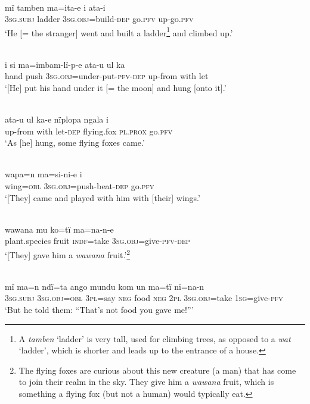 \\
\gll mï      tamben  ma=ita-e        i    ata-i\\
3\textsc{sg.subj}  ladder  3\textsc{sg.obj}=build-\textsc{dep}  go.\textsc{pfv}  up-go.\textsc{pfv}\\
\glt ‘He [= the stranger] went and built a ladder\footnote{A \textit{tamben} ‘ladder’ is very tall, used for climbing trees, as opposed to a \textit{wat} ‘ladder’, which is shorter and leads up to the entrance of a house.} and climbed up.’

\\
\gll i    si    ma=imbam-lï-p-e        ata-u    ul    ka\\
hand  push  3\textsc{sg.obj}=under-put-\textsc{pfv-dep}  up-from  with  let\\
\glt ‘[He] put his hand under it [= the moon] and hung [onto it].’

\\
\gll ata-u    ul    ka-e  nïplopa  ngala    i\\
up-from  with  let-\textsc{dep}  flying.fox  \textsc{pl.prox}  go.\textsc{pfv}\\
\glt ‘As [he] hung, some flying foxes came.’

\\
\gll wapa=n  ma=si-ni-e          i\\
wing=\textsc{obl}  3\textsc{sg.obj}=push-beat-\textsc{dep}  go.\textsc{pfv}\\
\glt ‘[They] came and played with him with [their] wings.’

\\
\gll wawana  mu    ko=tï  ma=na-n-e\\
plant.species  fruit  \textsc{indf}=take  3\textsc{sg.obj}=give-\textsc{pfv-dep}\\
\glt ‘[They] gave him a \textit{wawana} fruit.’\footnote{The flying foxes are curious about this new creature (a man) that has come to join their realm in the sky. They give him a \textit{wawana} fruit, which is something a flying fox (but not a human) would typically eat.}

\\
\gll mï      ma=n      ndï=ta    ango  mundu  kom  un  ma=tï nï=na-n\\
3\textsc{sg.subj}  3\textsc{sg.obj=obl}  3\textsc{pl}=say  \textsc{neg}  food  \textsc{neg}  2\textsc{pl}  3\textsc{sg.obj}=take 1\textsc{sg}=give-\textsc{pfv}\\
\glt ‘But he told them: “That’s not food you gave me!”’

